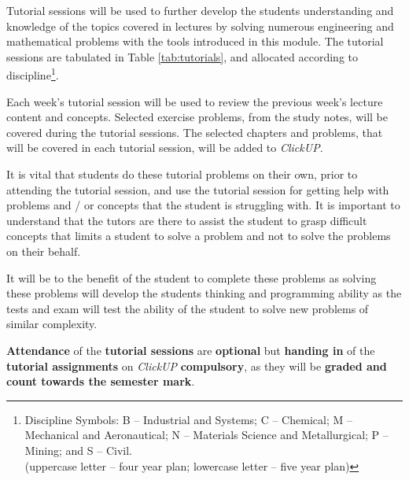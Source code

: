        Tutorial sessions will be used to further develop the students
        understanding and knowledge of the topics covered in lectures
        by solving numerous engineering and mathematical problems with
        the tools introduced in this module. The tutorial sessions are
        tabulated in Table \ref{tab:tutorials}, and allocated
        according to discipline\footnote{Discipline Symbols:
            B -- Industrial and Systems;
            C -- Chemical;
            M -- Mechanical and Aeronautical;
            N -- Materials Science and Metallurgical;
            P -- Mining; and
            S -- Civil. \\
            (uppercase letter -- four year plan;
            lowercase letter -- five year plan)}.

        Each week's tutorial session will be used to review the
        previous week's lecture content and concepts. Selected
        exercise problems, from the study notes, will be covered
        during the tutorial sessions. The selected chapters and
        problems, that will be covered in each tutorial session, will
        be added to {\it ClickUP}.

        It is vital that students do these tutorial problems on their
        own, prior to attending the tutorial session, and use the
        tutorial session for getting help with problems and / or
        concepts that the student is struggling with. It is important
        to understand that the tutors are there to assist the student
        to grasp difficult concepts that limits a student to solve a
        problem and not to solve the problems on their behalf.

        It will be to the benefit of the student to complete these
        problems as solving these problems will develop the students
        thinking and programming ability as the tests and exam will
        test the ability of the student to solve new problems of
        similar complexity.

        \textbf{Attendance} of the \textbf{tutorial sessions}
        are \textbf{optional} but \textbf{handing in} of the
        \textbf{tutorial assignments} on {\it ClickUP}
        \textbf{compulsory}, as they will be \textbf{graded and count
        towards the semester mark}.
